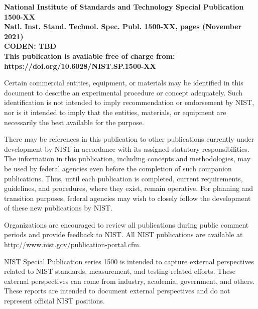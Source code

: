 \documentclass[12pt]{article}
\newcommand{\pubnumber}{1500-XX}
\newcommand{\DOI}{https://doi.org/10.6028/NIST.SP.1500-XX}
\newcommand{\monthyear}{November 2021}
\begin{document}
\begin{titlepage}
\footnotesize  

\begin{flushright}
\normalsize \textbf{National Institute of Standards and Technology Special Publication \pubnumber\\ 
Natl. Inst. Stand. Technol. Spec. Publ. \pubnumber, \pageref{LastPage} pages (\monthyear)} \\
\textbf{CODEN: TBD}\\
\vspace{12pt}
\textbf{This publication is available free of charge from: \DOI}

\end{flushright}


Certain commercial entities, equipment, or materials may be identified in this document to describe an experimental procedure or concept adequately. Such identification is not intended to imply recommendation or endorsement by NIST, nor is it intended to imply that the entities, materials, or equipment are necessarily the best available for the purpose. 

There may be references in this publication to other publications currently under development by NIST in accordance with its assigned statutory responsibilities. The information in this publication, including concepts and methodologies, may be used by federal agencies even before the completion of such companion publications. Thus, until each publication is completed, current requirements, guidelines, and procedures, where they exist, remain operative. For planning and transition purposes, federal agencies may wish to closely follow the development of these new publications by NIST. 

Organizations are encouraged to review all publications during public comment periods and provide feedback to NIST. All NIST publications are available at http://www.nist.gov/publication-portal.cfm.



\vspace{12pt}
\vspace{12pt}
NIST Special Publication series 1500 is intended to capture external perspectives related to NIST standards, measurement, and testing-related efforts. These external perspectives can come from industry, academia, government, and others. These reports are intended to document external perspectives and do not represent official NIST positions.


\end{titlepage}
\end{document}
